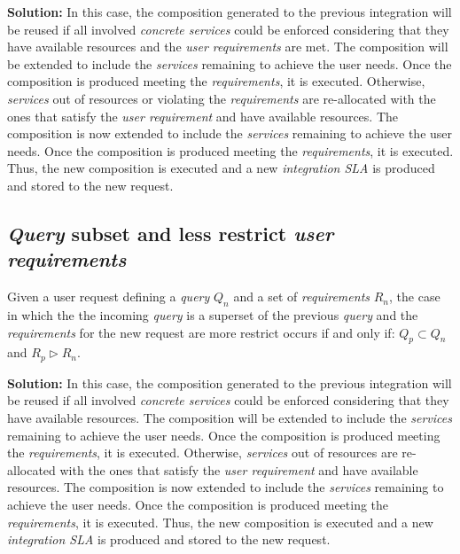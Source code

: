\bigskip
\noindent \textbf{Solution:} In this case, the composition generated to the previous integration will be reused if all involved \textsl{concrete services} could be enforced considering that they have available resources and the \textsl{user requirements} are met. The composition will be extended to include the \textsl{services} remaining to achieve the user needs. Once the composition is produced meeting the \textsl{requirements}, it is executed. Otherwise, \textsl{services} out of resources or violating the \textsl{requirements} are re-allocated with the ones that satisfy the \textsl{user requirement} and have available resources. The composition is now extended to include the \textsl{services} remaining to achieve the user needs. Once the composition is produced meeting the \textsl{requirements}, it is executed. Thus, the new composition is executed and a new \textsl{integration SLA} is produced and stored to the new request.

\subsection{\textsl{Query} subset and less restrict \textsl{user requirements}}
Given a user request defining a \textsl{query} $Q_{n}$ and a set of \textsl{requirements} $R_{n}$, the case in which the the incoming \textsl{query} is a superset of the previous \textsl{query} and the \textsl{requirements} for the new request are more restrict occurs if and only if: $Q_{p} \subset Q_{n}$ and $R_{p} \triangleright R_{n}$.

\bigskip
\noindent \textbf{Solution:} In this case, the composition generated to the previous integration will be reused if all involved \textsl{concrete services} could be enforced considering that they have available resources. The composition will be extended to include the \textsl{services} remaining to achieve the user needs. Once the composition is produced meeting the \textsl{requirements}, it is executed. Otherwise, \textsl{services} out of resources are re-allocated with the ones that satisfy the \textsl{user requirement} and have available resources. The composition is now extended to include the \textsl{services} remaining to achieve the user needs. Once the composition is produced meeting the \textsl{requirements}, it is executed. Thus, the new composition is executed and a new \textsl{integration SLA} is produced and stored to the new request.